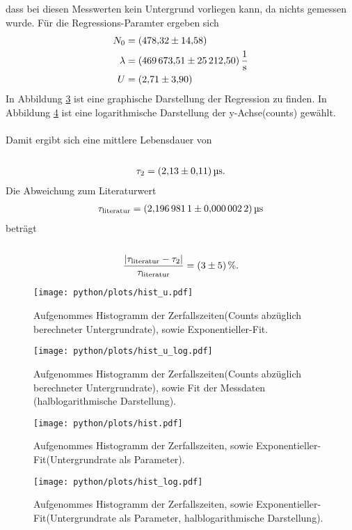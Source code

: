 dass bei diesen Messwerten kein Untergrund vorliegen kann, da nichts gemessen wurde. Für die Regressions-Paramter ergeben sich
\begin{align*}
  N_{0} &= \SI{478.32+-14.58}{}\\
  \lambda &= \SI{469673.51+-25212.50}{\per\second}\\
  U &= \SI{2.71+-3.90}{}
\end{align*}
In Abbildung \ref{fig:hist} ist eine graphische Darstellung der Regression zu finden. In Abbildung \ref{fig:hist_log} ist eine logarithmische Darstellung der y-Achse(counts) gewählt.\\ \\
Damit ergibt sich eine mittlere Lebensdauer von\\ \\
\begin{align*}
  \tau_{2} = \SI{2.13+-0.11}{\micro\second} .
\end{align*}
Die Abweichung zum Literaturwert \cite{lebensdauer}
\begin{align*}
  \tau_\text{literatur} = \SI{2.1969811+-0.0000022}{\micro\second}
\end{align*}
beträgt\\ \\
\begin{align*}
  \frac{\lvert \tau_\text{literatur} - \tau_{2} \rvert}{\tau_\text{literatur}} = \SI{3+-5}{\percent} .
\end{align*}

\FloatBarrier
\begin{figure}
  \centering
  \texttt{[image: python/plots/hist\_u.pdf]}
  \caption{Aufgenommes Histogramm der Zerfallszeiten(Counts abzüglich berechneter Untergrundrate), sowie Exponentieller-Fit.}
  \label{fig:hist2}
\end{figure}

\begin{figure}
  \centering
  \texttt{[image: python/plots/hist\_u\_log.pdf]}
  \caption{Aufgenommes Histogramm der Zerfallszeiten(Counts abzüglich berechneter Untergrundrate), sowie Fit der Messdaten (halblogarithmische Darstellung).}
  \label{fig:hist2_log}
\end{figure}

\begin{figure}
  \centering
  \texttt{[image: python/plots/hist.pdf]}
  \caption{Aufgenommes Histogramm der Zerfallszeiten, sowie Exponentieller-Fit(Untergrundrate als Parameter).}
  \label{fig:hist}
\end{figure}

\begin{figure}
  \centering
  \texttt{[image: python/plots/hist\_log.pdf]}
  \caption{Aufgenommes Histogramm der Zerfallszeiten, sowie Exponentieller-Fit(Untergrundrate als Parameter, halblogarithmische Darstellung).}
  \label{fig:hist_log}
\end{figure}
\FloatBarrier
